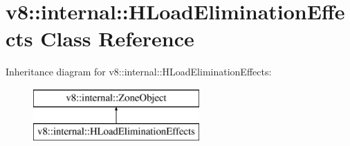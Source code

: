 \hypertarget{classv8_1_1internal_1_1_h_load_elimination_effects}{}\section{v8\+:\+:internal\+:\+:H\+Load\+Elimination\+Effects Class Reference}
\label{classv8_1_1internal_1_1_h_load_elimination_effects}
Inheritance diagram for v8\+:\+:internal\+:\+:H\+Load\+Elimination\+Effects\+:\begin{figure}[H]
\begin{center}
\leavevmode
\includegraphics[height=2.000000cm]{classv8_1_1internal_1_1_h_load_elimination_effects}
\end{center}
\end{figure}
